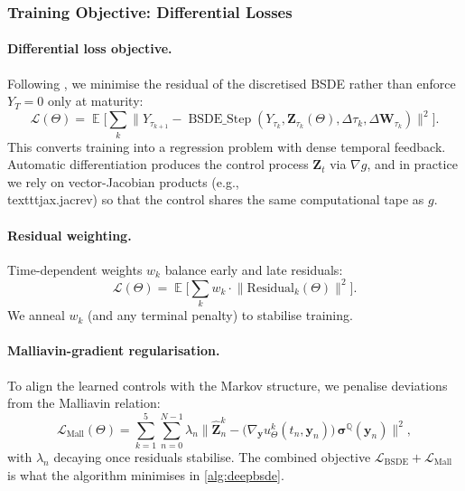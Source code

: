 \documentclass[11pt,letterpaper,oneside]{article}
\numberwithin{equation}{section}
\DeclareMathOperator{\E}{\mathbb{E}}
\newcommand{\1}{\mathbf{1}}
\begin{document}
\subsubsection{Training Objective: Differential Losses}

\paragraph{Differential loss objective.}
Following \cite{kapllani2024,huang2025probabilistic}, we minimise the residual of the discretised BSDE rather than enforce $Y_T=0$ only at maturity:
\[
  \mathcal{L}(\Theta) = \E\Big[\sum_k \big\| Y_{\tau_{k+1}} - \operatorname{BSDE\_Step}(Y_{\tau_k}, \bm{Z}_{\tau_k}(\Theta), \Delta \tau_k, \Delta\bm{W}_{\tau_k}) \big\|^2\Big].
\]
This converts training into a regression problem with dense temporal feedback. Automatic differentiation produces the control process $\bm{Z}_t$ via $\nabla g$, and in practice we rely on vector-Jacobian products (e.g., \\texttt{jax.jacrev}) so that the control shares the same computational tape as $g$.

\paragraph{Residual weighting.}
Time-dependent weights $w_k$ balance early and late residuals:
\[
  \mathcal{L}(\Theta) = \E\Big[\sum_k w_k \cdot \big\| \text{Residual}_k(\Theta) \big\|^2\Big].
\]
We anneal $w_k$ (and any terminal penalty) to stabilise training.

\paragraph{Malliavin-gradient regularisation.}
To align the learned controls with the Markov structure, we penalise deviations from the Malliavin relation:
\[
  \mathcal{L}_{\text{Mall}}(\Theta)
  = \sum_{k=1}^5 \sum_{n=0}^{N-1} \lambda_n \Big\lVert \widehat{\bm{Z}}_{n}^{k} -
    \big(\nabla_{\bm{y}} u_{\Theta}^{k}(t_n,\bm{y}_n)\big)\,\bm{\sigma}^{\mathbb{Q}}(\bm{y}_n) \Big\rVert^2,
\]
with $\lambda_n$ decaying once residuals stabilise. The combined objective $\mathcal{L}_{\text{BSDE}} + \mathcal{L}_{\text{Mall}}$ is what the algorithm minimises in \cref{alg:deepbsde}.
\end{document}

